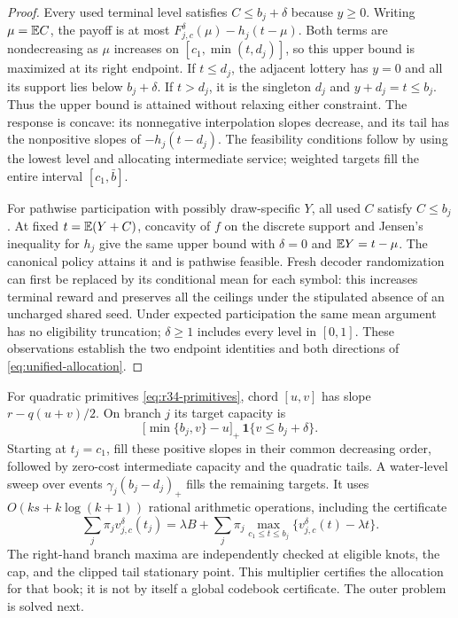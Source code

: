 \begin{proof}
Every used terminal level satisfies $C\leq b_j+\delta$ because $y\geq0$. Writing $\mu=\mathbb E C$, the payoff is at most $F_{j,c}^\delta(\mu)-h_j(t-\mu)$. Both terms are nondecreasing as $\mu$ increases on $[c_1,\min(t,d_j)]$, so this upper bound is maximized at its right endpoint. If $t\leq d_j$, the adjacent lottery has $y=0$ and all its support lies below $b_j+\delta$. If $t>d_j$, it is the singleton $d_j$ and $y+d_j=t\leq b_j$. Thus the upper bound is attained without relaxing either constraint. The response is concave: its nonnegative interpolation slopes decrease, and its tail has the nonpositive slopes of $-h_j(t-d_j)$. The feasibility conditions follow by using the lowest level and allocating intermediate service; weighted targets fill the entire interval $[c_1,\bar b]$.

For pathwise participation with possibly draw-specific $Y$, all used $C$ satisfy $C\leq b_j$. At fixed $t=\mathbb E(Y+C)$, concavity of $f$ on the discrete support and Jensen's inequality for $h_j$ give the same upper bound with $\delta=0$ and $\mathbb E Y=t-\mu$. The canonical policy attains it and is pathwise feasible. Fresh decoder randomization can first be replaced by its conditional mean for each symbol: this increases terminal reward and preserves all the ceilings under the stipulated absence of an uncharged shared seed. Under expected participation the same mean argument has no eligibility truncation; $\delta\geq1$ includes every level in $[0,1]$. These observations establish the two endpoint identities and both directions of \eqref{eq:unified-allocation}.
\end{proof}

For quadratic primitives \eqref{eq:r34-primitives}, chord $[u,v]$ has slope $r-q(u+v)/2$. On branch $j$ its target capacity is
\[
 \bigl[\min\{b_j,v\}-u\bigr]_+\,\mathbf 1\{v\leq b_j+\delta\}.
\]
Starting at $t_j=c_1$, fill these positive slopes in their common decreasing order, followed by zero-cost intermediate capacity and the quadratic tails. A water-level sweep over events $\gamma_j(b_j-d_j)_+$ fills the remaining targets. It uses $O(ks+k\log(k+1))$ rational arithmetic operations, including the certificate
\begin{equation}\label{eq:prefix-dual}
 \sum_j\pi_jv_{j,c}^\delta(t_j)
 =\lambda B+\sum_j\pi_j\max_{c_1\leq t\leq b_j}
       \{v_{j,c}^\delta(t)-\lambda t\}.
\end{equation}
The right-hand branch maxima are independently checked at eligible knots, the cap, and the clipped tail stationary point. This multiplier certifies the allocation for that book; it is not by itself a global codebook certificate. The outer problem is solved next.

